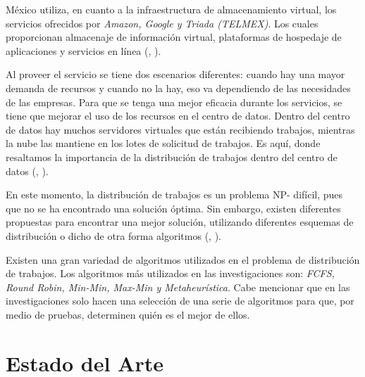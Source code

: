 M\'exico utiliza, en cuanto a la infraestructura de almacenamiento virtual, los servicios ofrecidos por \textit{Amazon, Google y Triada (TELMEX)}. Los cuales proporcionan almacenaje de informaci\'on virtual, plataformas de hospedaje de aplicaciones y servicios en l\'inea (\citeauthor{mariscal2013computo}, \citeyear{mariscal2013computo}).

Al proveer el servicio se tiene dos escenarios diferentes: cuando hay una mayor demanda de recursos y cuando no la hay,  eso va dependiendo de las necesidades de las empresas. 
Para que se tenga una mejor eficacia durante los servicios, se tiene que mejorar el uso de los recursos en el centro de datos. Dentro del centro de datos hay muchos servidores virtuales que est\'an recibiendo trabajos, mientras la nube las mantiene en los lotes de solicitud de trabajos. Es aqu\'i, donde resaltamos la importancia de la distribuci\'on de trabajos dentro del centro de datos (\citeauthor{shimpy2014different}, \citeyear{shimpy2014different}). 

En este momento, la distribuci\'on de trabajos es un problema NP- dif\'icil, pues que no se ha encontrado una soluci\'on \'optima. Sin embargo, existen diferentes propuestas para encontrar una mejor soluci\'on, utilizando diferentes esquemas de distribuci\'on o dicho de otra forma algoritmos (\citeauthor{shimpy2014different}, \citeyear{shimpy2014different}). 

Existen una gran variedad de algoritmos utilizados en el problema de distribuci\'on de trabajos. Los algoritmos m\'as utilizados en las investigaciones son: \textit{FCFS, Round Robin, Min-Min, Max-Min y Metaheur\'istica}. Cabe mencionar que en las investigaciones solo hacen una selecci\'on de una serie de algoritmos para que, por medio de pruebas, determinen qui\'en es el mejor de ellos. 


\newpage
\section{Estado del Arte}


